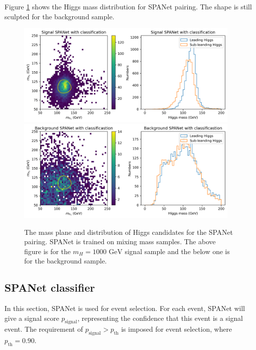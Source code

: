 \documentclass[12pt]{article}
\begin{document}
		Figure \ref{fig:Higgs_mass_new_mix_SPANET_cls} shows the Higgs mass distribution for SPANet pairing. The shape is still sculpted for the background sample.
		\begin{figure}[htpb]
			\centering
			\includegraphics[width=0.97\textwidth]{Higgs_mass_res_mix_cls_SPANET_s.png}
			\includegraphics[width=0.97\textwidth]{Higgs_mass_res_mix_cls_SPANET_4b.png}
			\caption{The mass plane and distribution of Higgs candidates for the SPANet pairing. SPANet is trained on mixing mass samples. The above figure is for the $m_H = \text{1000 GeV}$ signal sample and the below one is for the background sample.}
			\label{fig:Higgs_mass_new_mix_SPANET_cls}
		\end{figure}
	\subsection{SPANet classifier}%
	\label{sub:spanet_classifier}
		In this section, SPANet is used for event selection. For each event, SPANet will give a signal score $p_\text{signal}$, representing the confidence that this event is a signal event. The requirement of $p_\text{signal} > p_\text{th}$ is imposed for event selection, where $p_\text{th} = 0.90$.
\end{document}
